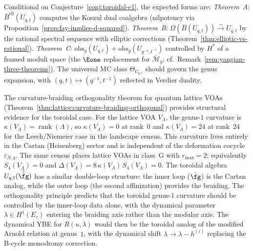 \begin{remark}
\label{rem:toroidal-three-theorems}
Conditional on Conjecture~\ref{conj:toroidal-e1}, the expected forms are:
\emph{Theorem~A}: $\bar{B}^{\mathrm{ell}}(U_{q,t})$ computes the Koszul dual coalgebra (nilpotency via Proposition~\ref{prop:fay-implies-d-squared}).
\emph{Theorem~B}: $\Omega(\bar{B}(U_{q,t})) \xrightarrow{\sim} U_{q,t}$ by the rational spectral sequence with elliptic corrections (Theorem~\ref{thm:elliptic-vs-rational}).
\emph{Theorem~C}: $\mathrm{obs}_g(U_{q,t}) + \mathrm{obs}_g(U_{q^{-1},t^{-1}})$ controlled by $H^*$ of a framed moduli space (the $\Eone$ replacement for $\overline{\mathcal{M}}_g$; cf.\ Remark~\ref{rem:yangian-three-theorems}).
The universal MC class $\Theta_{U_{q,t}}$ should govern the genus expansion, with $(q,t) \mapsto (q^{-1},t^{-1})$ reflected in Verdier duality.
\end{remark}

\begin{remark}
\label{rem:toroidal-lattice-evidence}
The curvature-braiding orthogonality theorem for quantum lattice VOAs
(Theorem~\ref{thm:lattice:curvature-braiding-orthogonal}) provides
structural evidence for the toroidal case. For the lattice VOA
$V_\Lambda$, the genus-$1$ curvature is
$\kappa(V_\Lambda) = \operatorname{rank}(\Lambda)$, so
$\kappa(V_\Lambda) = 0$ at rank~$0$ and
$\kappa(V_\Lambda) = 24$ at rank~$24$ for the Leech/Niemeier case in
the landscape census. This curvature lives
entirely in the Cartan (Heisenberg) sector and is independent of the
deformation cocycle $\varepsilon_{N,q}$. The same census places lattice
VOAs in class~G with $r_{\max} = 2$; equivalently
$S_4(V_\Lambda) = 0$ and
$\Delta(V_\Lambda) = 8\,\kappa(V_\Lambda)\,S_4(V_\Lambda) = 0$.
The toroidal algebra $U_{q,t}(\hat{\hat{\fg}})$
has a similar double-loop structure: the inner loop ($\hat{\fg}$) is the
Cartan analog, while the outer loop (the second affinization) provides
the braiding. The orthogonality principle predicts that the toroidal
genus-$1$ curvature should be controlled by the inner-loop data alone,
with the dynamical parameter $\lambda \in H^1(E_\tau)$ entering the
braiding axis rather than the modular axis. The dynamical YBE for
$R(u, \lambda)$ would then be the toroidal analog of the modified
Arnold relation at genus~$1$, with the dynamical shift
$\lambda \to \lambda - h^{(i)}$ replacing the B-cycle monodromy
correction.
\end{remark}

